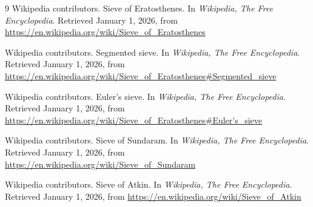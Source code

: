 \documentclass{article}
\begin{document}
\begin{thebibliography}{9}
    Wikipedia contributors. Sieve of Eratosthenes. In \textit{Wikipedia, The Free Encyclopedia}. Retrieved January 1, 2026, from \url{https://en.wikipedia.org/wiki/Sieve_of_Eratosthenes}

    Wikipedia contributors. Segmented sieve. In \textit{Wikipedia, The Free Encyclopedia}. Retrieved January 1, 2026, from \url{https://en.wikipedia.org/wiki/Sieve_of_Eratosthenes#Segmented_sieve}

    Wikipedia contributors. Euler's sieve. In \textit{Wikipedia, The Free Encyclopedia}. Retrieved January 1, 2026, from \url{https://en.wikipedia.org/wiki/Sieve_of_Eratosthenes#Euler's_sieve}

    Wikipedia contributors. Sieve of Sundaram. In \textit{Wikipedia, The Free Encyclopedia}. Retrieved January 1, 2026, from \url{https://en.wikipedia.org/wiki/Sieve_of_Sundaram}

    Wikipedia contributors. Sieve of Atkin. In \textit{Wikipedia, The Free Encyclopedia}. Retrieved January 1, 2026, from \url{https://en.wikipedia.org/wiki/Sieve_of_Atkin}
\end{thebibliography}
\end{document}
